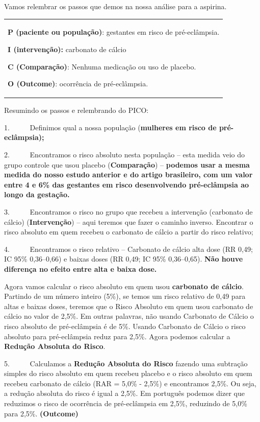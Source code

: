 \documentclass[
  letterpaper,
  DIV=11,
  numbers=noendperiod]{scrreprt}
\begin{document}
Vamos relembrar os passos que demos na nossa análise para a aspirina.

\begin{longtable}[]{@{}
  >{\raggedright\arraybackslash}p{}@{}}
\toprule\noalign{}
\endhead
\bottomrule\noalign{}
\endlastfoot
\textbf{P (paciente ou população)}: gestantes em risco de pré-eclâmpsia.

\textbf{I (intervenção):} carbonato de cálcio

\textbf{C (Comparação)}: Nenhuma medicação ou uso de placebo.

\textbf{O (Outcome)}: ocorrência de pré-eclâmpsia. \\
\end{longtable}

Resumindo os passos e relembrando do PICO:

1.~~~~~ Definimos qual a nossa população (\textbf{mulheres em risco de
pré-eclâmpsia);}

2.~~~~~ Encontramos o risco absoluto nesta população -- esta medida veio
do grupo controle que usou placebo (\textbf{Comparação}) --
\textbf{podemos usar a mesma medida do nosso estudo anterior e do artigo
brasileiro, com um valor entre 4 e 6\% das gestantes em risco
desenvolvendo pré-eclâmpsia ao longo da gestação.}

3.~~~~~ Encontramos o risco no grupo que recebeu a intervenção
(carbonato de cálcio) (\textbf{Intervenção}) -- aqui teremos que fazer o
caminho inverso. Encontrar o risco absoluto em quem recebeu o carbonato
de cálcio a partir do risco relativo;

4.~~~~~ Encontramos o risco relativo -- Carbonato de cálcio alta dose
(RR 0,49; IC 95\% 0,36--0,66) e baixas doses (RR 0,49; IC 95\%
0,36--0,65). \textbf{Não houve diferença no efeito entre alta e baixa
dose.}

Agora vamos calcular o risco absoluto em quem usou \textbf{carbonato de
cálcio}. Partindo de um número inteiro (5\%), se temos um risco relativo
de 0,49 para altas e baixas doses, teremos que o Risco Absoluto em quem
usou carbonato de cálcio no valor de 2,5\%. Em outras palavras, não
usando Carbonato de Cálcio o risco absoluto de pré-eclâmpsia é de 5\%.
Usando Carbonato de Cálcio o risco absoluto para pré-eclâmpsia reduz
para 2,5\%. Agora podemos calcular a \textbf{Redução Absoluta do Risco}.

5.~~~~~ Calculamos a \textbf{Redução Absoluta do Risco} fazendo uma
subtração simples do risco absoluto em quem recebeu placebo e o risco
absoluto em quem recebeu carbonato de cálcio (RAR = 5,0\% - 2,5\%) e
encontramos 2,5\%. Ou seja, a redução absoluta do risco é igual a 2,5\%.
Em português podemos dizer que reduzimos o risco de ocorrência de
pré-eclâmpsia em 2,5\%, reduzindo de 5,0\% para 2,5\%.
\textbf{(Outcome)}
\end{document}
